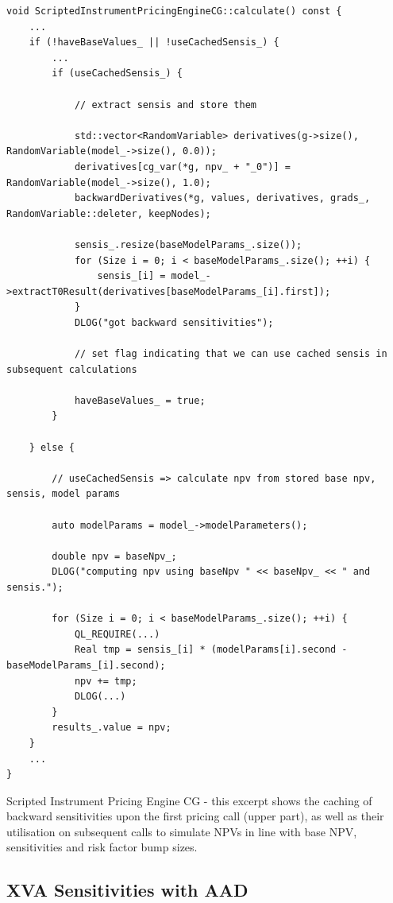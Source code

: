 \documentclass[12pt, a4paper]{report}
\begin{document}
\begin{listing}[hbt]
\begin{verbatim}
void ScriptedInstrumentPricingEngineCG::calculate() const {
    ...
    if (!haveBaseValues_ || !useCachedSensis_) {
        ...
        if (useCachedSensis_) {

            // extract sensis and store them

            std::vector<RandomVariable> derivatives(g->size(), RandomVariable(model_->size(), 0.0));
            derivatives[cg_var(*g, npv_ + "_0")] = RandomVariable(model_->size(), 1.0);
            backwardDerivatives(*g, values, derivatives, grads_, RandomVariable::deleter, keepNodes);

            sensis_.resize(baseModelParams_.size());
            for (Size i = 0; i < baseModelParams_.size(); ++i) {
                sensis_[i] = model_->extractT0Result(derivatives[baseModelParams_[i].first]);
            }
            DLOG("got backward sensitivities");

            // set flag indicating that we can use cached sensis in subsequent calculations

            haveBaseValues_ = true;
        }

    } else {

        // useCachedSensis => calculate npv from stored base npv, sensis, model params

        auto modelParams = model_->modelParameters();

        double npv = baseNpv_;
        DLOG("computing npv using baseNpv " << baseNpv_ << " and sensis.");

        for (Size i = 0; i < baseModelParams_.size(); ++i) {
            QL_REQUIRE(...)
            Real tmp = sensis_[i] * (modelParams[i].second - baseModelParams_[i].second);
            npv += tmp;
            DLOG(...)
        }
        results_.value = npv;
    }
    ...
}
\end{verbatim}
\caption{Scripted Instrument Pricing Engine CG - this excerpt shows the caching of backward
  sensitivities upon the first pricing call (upper part), as well as their utilisation on subsequent
  calls to simulate NPVs in line with base NPV, sensitivities and risk factor bump sizes.}
\label{lst:sensicache}
\end{listing}


\subsection{XVA Sensitivities with AAD}
\end{document}
